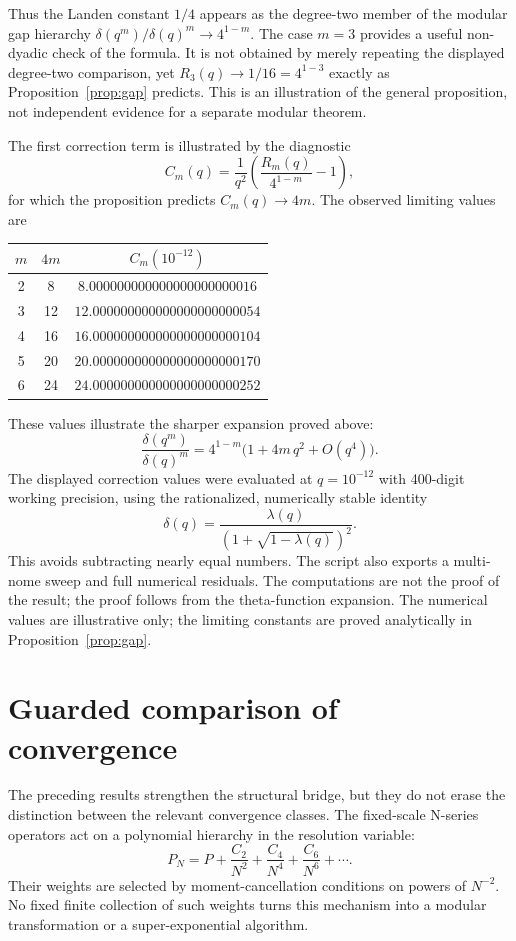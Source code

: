 \documentclass[11pt]{article}
\begin{document}
Thus the Landen constant $1/4$ appears as the degree-two member of the modular
gap hierarchy $\delta(q^m)/\delta(q)^m\to4^{1-m}$. The case $m=3$ provides a
useful non-dyadic check of the formula. It is not obtained by merely repeating
the displayed degree-two comparison, yet $R_3(q)\to1/16=4^{1-3}$ exactly as
Proposition~\ref{prop:gap} predicts. This is an illustration of the general
proposition, not independent evidence for a separate modular theorem.

The first correction term is illustrated by the diagnostic
\[
C_m(q)=\frac{1}{q^2}\left(\frac{R_m(q)}{4^{1-m}}-1\right),
\]
for which the proposition predicts $C_m(q)\to 4m$. The observed limiting values
are

\begin{center}
\begin{tabular}{ccc}
\toprule
$m$ & $4m$ & $C_m(10^{-12})$ \\
\midrule
2 & 8  & $8.000000000000000000000016$ \\
3 & 12 & $12.000000000000000000000054$ \\
4 & 16 & $16.000000000000000000000104$ \\
5 & 20 & $20.000000000000000000000170$ \\
6 & 24 & $24.000000000000000000000252$ \\
\bottomrule
\end{tabular}
\end{center}

These values illustrate the sharper expansion proved above:
\[
\frac{\delta(q^m)}{\delta(q)^m}=4^{1-m}\bigl(1+4m\,q^2+O(q^4)\bigr).
\]
The displayed correction values were evaluated at $q=10^{-12}$ with 400-digit
working precision, using the rationalized, numerically stable identity
\[
\delta(q)=\frac{\lambda(q)}{(1+\sqrt{1-\lambda(q)})^2}.
\]
This avoids subtracting nearly equal numbers. The script also exports a
multi-nome sweep and full numerical residuals. The computations are not the proof of the result; the
proof follows from the theta-function expansion. The numerical values are
illustrative only; the limiting constants are proved analytically in
Proposition~\ref{prop:gap}.

\section{Guarded comparison of convergence}

The preceding results strengthen the structural bridge, but they do not erase
the distinction between the relevant convergence classes. The fixed-scale
N-series operators act on a polynomial hierarchy in the resolution variable:
\[
P_N=P+\frac{C_2}{N^2}+\frac{C_4}{N^4}+\frac{C_6}{N^6}+\cdots.
\]
Their weights are selected by moment-cancellation conditions on powers of
$N^{-2}$. No fixed finite collection of such weights turns this mechanism into
a modular transformation or a super-exponential algorithm.
\end{document}
